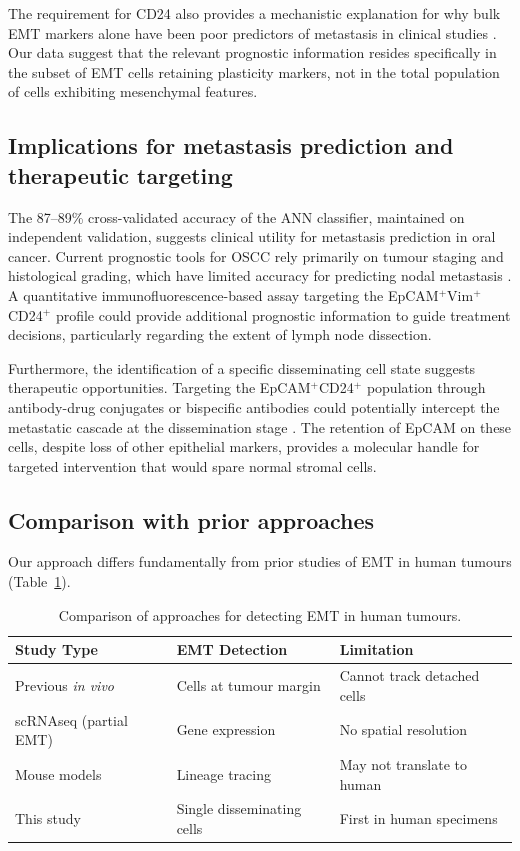 \documentclass[11pt]{article}
\begin{document}
The requirement for CD24 also provides a mechanistic explanation for why bulk EMT markers alone have been poor predictors of metastasis in clinical studies \citep{Taube2010}. Our data suggest that the relevant prognostic information resides specifically in the subset of EMT cells retaining plasticity markers, not in the total population of cells exhibiting mesenchymal features.

\subsection{Implications for metastasis prediction and therapeutic targeting}

The 87--89\% cross-validated accuracy of the ANN classifier, maintained on independent validation, suggests clinical utility for metastasis prediction in oral cancer. Current prognostic tools for OSCC rely primarily on tumour staging and histological grading, which have limited accuracy for predicting nodal metastasis \citep{Woolgar2006,Almangush2015}. A quantitative immunofluorescence-based assay targeting the EpCAM$^{+}$Vim$^{+}$CD24$^{+}$ profile could provide additional prognostic information to guide treatment decisions, particularly regarding the extent of lymph node dissection.

Furthermore, the identification of a specific disseminating cell state suggests therapeutic opportunities. Targeting the EpCAM$^{+}$CD24$^{+}$ population through antibody-drug conjugates or bispecific antibodies could potentially intercept the metastatic cascade at the dissemination stage \citep{Soysal2015,Gires2020}. The retention of EpCAM on these cells, despite loss of other epithelial markers, provides a molecular handle for targeted intervention that would spare normal stromal cells.

\subsection{Comparison with prior approaches}

Our approach differs fundamentally from prior studies of EMT in human tumours (Table~\ref{tab:comparison}).

\begin{table}[ht]
\centering
\caption{Comparison of approaches for detecting EMT in human tumours.}
\label{tab:comparison}
\begin{tabular}{lll}
\toprule
Study Type & EMT Detection & Limitation \\
\midrule
Previous \textit{in vivo} & Cells at tumour margin & Cannot track detached cells \\
scRNAseq (partial EMT) & Gene expression & No spatial resolution \\
Mouse models & Lineage tracing & May not translate to human \\
This study & Single disseminating cells & First in human specimens \\
\bottomrule
\end{tabular}
\end{table}
\end{document}
